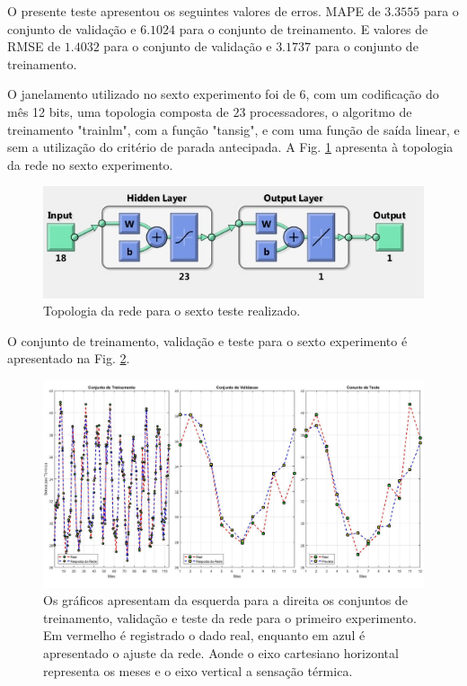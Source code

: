 \documentclass[journal, a4paper]{IEEEtran}
\begin{document}
O presente teste apresentou os seguintes valores de erros. MAPE de $3.3555$ para o conjunto de validação e $6.1024 $ para o conjunto de treinamento. E valores de RMSE de $1.4032$ para o conjunto de validação e $3.1737$ para o conjunto de treinamento. 

O janelamento utilizado no sexto experimento foi de 6, com um codificação do mês 12 bits, uma topologia composta de $23$ processadores, o algoritmo de treinamento "trainlm", com a função "tansig", e com uma função de saída linear, e sem a utilização do critério de parada antecipada. A Fig. \ref{topo6} apresenta à topologia da rede no sexto experimento. 

\begin{figure}[H]
	\centering
	\includegraphics[scale=0.5]{Images/topologia6.jpg}
	\caption{Topologia da rede para o sexto teste realizado.}
	\label{topo6}
\end{figure} 


O conjunto de treinamento, validação e teste para o sexto experimento é apresentado na Fig. \ref{teste6}.

\begin{figure}[H]
	\centering
	\includegraphics[scale=0.15]{Images/Teste6.jpg}
	\caption{Os gráficos apresentam da esquerda para a direita os conjuntos de treinamento, validação e teste da rede para o primeiro experimento. Em vermelho é registrado o dado real, enquanto em azul é apresentado o ajuste da rede. Aonde o eixo cartesiano horizontal representa os meses e o eixo vertical a sensação térmica.}
	\label{teste6}
\end{figure} 
\end{document}
